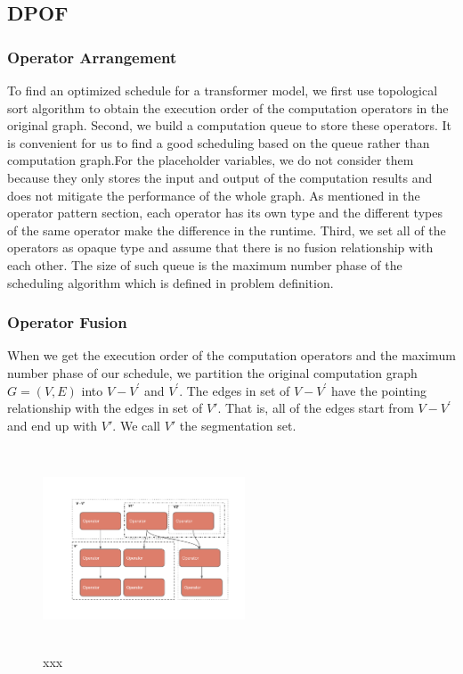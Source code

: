 \subsection{DPOF}


\subsubsection{Operator Arrangement}
To find an optimized schedule for a transformer model, we first use topological sort algorithm to obtain the execution order of the computation operators in the 
original graph. Second, we build a computation queue to store these operators. It is convenient for us to find a good scheduling based on the queue rather than 
computation graph.For the placeholder variables, we do not consider them because they only stores the input and output of the computation results and does 
not mitigate the performance of the whole graph. As mentioned in the operator pattern section, each operator has its own type and the different types of the same 
operator make the difference in the runtime. Third, we set all of the operators as opaque type and assume that there is no fusion relationship with each other.
The size of such queue is the maximum number phase of the scheduling algorithm which is defined in problem definition.


\subsubsection{Operator Fusion}
When we get the execution order of the computation operators and the maximum number phase of our schedule, we partition the original computation graph
$G=(V, E)$ into $V-V^{'}$ and $V^{'}$. The edges in set of $V-V^{'}$ have the pointing relationship with the edges in set of $V{'}$. That is, all of the 
edges start from $V-V^{'}$ and end up with $V{'}$. We call $V{'}$ the segmentation set.

\begin{figure}[htbp]
    \centering
    \includegraphics[height=6cm, width=6cm]{figs/fig2}
    \caption{xxx}
    \label{fig:fig1}
\end{figure}

